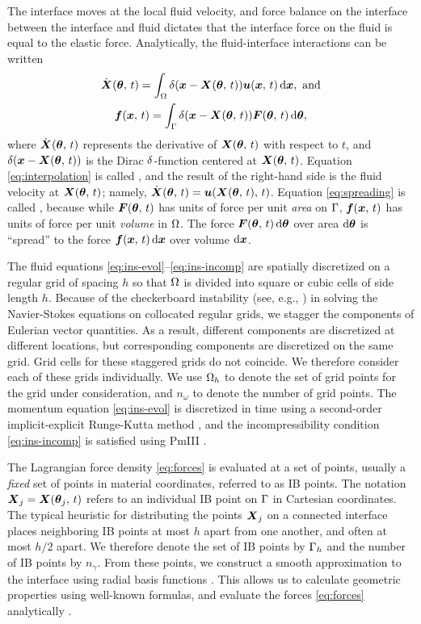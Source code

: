 The interface moves at the local fluid velocity, and force balance on the interface
between the interface and fluid dictates that the interface force on the fluid is equal
to the elastic force. Analytically, the fluid-interface interactions can be written
\begin{gather}
    \label{eq:interpolation}
    \U(\params,\,t) = \int_\domain \Dirac(\x-\X(\params,\,t)) \u(\x,\,t)\d\x,\ \text{and} \\
    \label{eq:spreading}
    \f(\x,\,t) = \int_\interface \Dirac(\x-\X(\params,\,t))\F(\params,\,t)\d\params,
\end{gather}
where $\dot{\boldsymbol{X}}(\boldsymbol{\theta},\,t)$ represents the derivative of $\boldsymbol{X}(\boldsymbol{\theta},\,t)$ with respect to
$t$, and $\delta(\boldsymbol{x}-\boldsymbol{X}(\boldsymbol{\theta},\,t))$ is the Dirac $\delta$-function centered at
$\boldsymbol{X}(\boldsymbol{\theta},\,t)$.  Equation \eqref{eq:interpolation} is called , and
the result of the right-hand side is the fluid velocity at $\boldsymbol{X}(\boldsymbol{\theta},\,t)$; namely,
$\dot{\boldsymbol{X}}(\boldsymbol{\theta},\,t) = \boldsymbol{u}(\boldsymbol{X}(\boldsymbol{\theta},\,t),\,t)$.  Equation \eqref{eq:spreading} is called
, because while $\boldsymbol{F}(\boldsymbol{\theta},\,t)$ has units of force per unit \emph{area}
on $\Gamma$, $\boldsymbol{f}(\boldsymbol{x},\,t)$ has units of force per unit \emph{volume} in $\Omega$. The
force $\F(\params,\,t)\d\params$ over area $\d\params$ is ``spread'' to the force
$\f(\x,\,t)\d\x$ over volume $\d\x$. 

The fluid equations \eqref{eq:ins-evol}--\eqref{eq:ins-incomp} are spatially discretized
on a regular grid of spacing $h$ so that $\Omega$ is divided into square or cubic cells
of side length $h$. Because of the checkerboard instability (see, e.g.,
\cite{Wesseling:2001ci}) in solving the Navier-Stokes equations on collocated regular
grids, we stagger the components of Eulerian vector quantities. As a result, different
components are discretized at different locations, but corresponding components are
discretized on the same grid. Grid cells for these staggered grids do not coincide. We
therefore consider each of these grids individually. We use $\Omega_h$ to denote the set
of grid points for the grid under consideration, and $n_\omega$ to denote the number of
grid points. The momentum equation \eqref{eq:ins-evol} is discretized in time using a
second-order implicit-explicit Runge-Kutta method \cite{Peskin:2002go}, and the
incompressibility condition \eqref{eq:ins-incomp} is satisfied using PmIII
\cite{Brown:2001bq}.

The Lagrangian force density \ref{eq:forces} is evaluated at a set of points, usually a
\emph{fixed} set of points in material coordinates, referred to as IB points. The
notation $\boldsymbol{X}_j=\boldsymbol{X}(\boldsymbol{\theta}_j,\,t)$ refers to an individual IB point on $\Gamma$ in
Cartesian coordinates. The typical heuristic for distributing the points $\boldsymbol{X}_j$ on a
connected interface places neighboring IB points at most $h$ apart from one another, and
often at most $h/2$ apart. We therefore denote the set of IB points by $\Gamma_h$ and
the number of IB points by $n_\gamma$. From these points, we construct a smooth
approximation to the interface using radial basis functions \cite{Shankar:2015km}. This
allows us to calculate geometric properties using well-known formulas, and evaluate the
forces \eqref{eq:forces} analytically \cite{Maxian:2018ek}.

